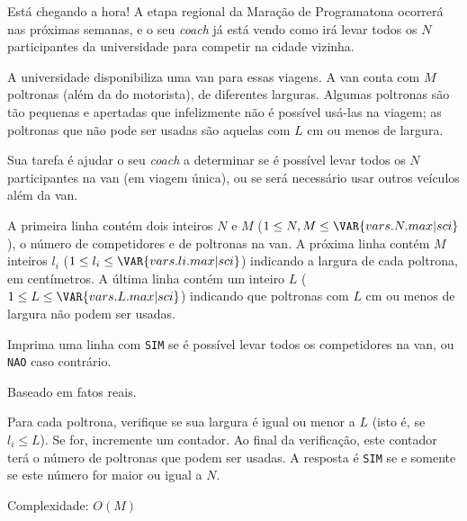 Está chegando a hora! A etapa regional da Maração de Programatona ocorrerá nas
próximas semanas, e o seu \textit{coach} já está vendo como irá levar todos os $N$
participantes da universidade para competir na cidade vizinha.

A universidade disponibiliza uma van para essas viagens. A van conta com $M$
poltronas (além da do motorista), de diferentes larguras. Algumas poltronas são tão pequenas e
apertadas que infelizmente não é possível usá-las na viagem; as poltronas que
não pode ser usadas são aquelas com $L$ cm ou menos de largura.

Sua tarefa é ajudar o seu \textit{coach} a determinar se é possível levar todos
os $N$ participantes na van (em viagem única), ou se será necessário usar outros veículos além da van.


A primeira linha contém dois inteiros $N$ e $M$ ($1 \leq N, M \leq \VAR{vars.N.max | sci}$), o número de competidores e de poltronas na van.
A próxima linha contém $M$ inteiros $l_i$ ($1 \leq l_i \leq \VAR{vars.li.max | sci}$)
indicando a largura de cada poltrona, em centímetros.
A última linha contém um inteiro $L$ ($1 \leq L \leq \VAR{vars.L.max | sci}$)
indicando que poltronas com $L$ cm ou menos de largura não podem ser usadas.

Imprima uma linha com
\texttt{SIM} se é possível levar todos os competidores na
van, ou \texttt{NAO} caso contrário.

Baseado em fatos reais.

Para cada poltrona, verifique se sua largura é igual ou menor a $L$ (isto é, se
        $l_i \leq L$). Se for, incremente um contador.
Ao final da verificação, este contador terá o número de poltronas que podem ser
usadas. A resposta é \texttt{SIM} se e somente se este número for maior ou
igual a $N$.

Complexidade: $O(M)$
